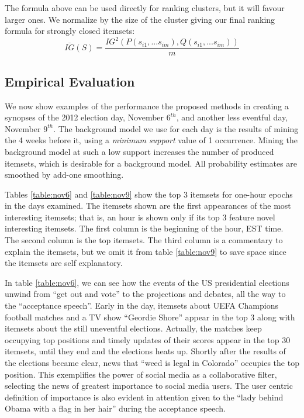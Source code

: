 \documentclass{sig-alternate}
\begin{document}
The formula above can be used directly for ranking clusters,
but it will favour larger ones.
We normalize by the size of the cluster giving our final ranking formula for
strongly closed itemsets:
\begin{equation}\label{eq:avgIG}\overline{IG}(S) = \frac{IG^2(P(s_{i1},...s_{im}),Q(s_{i1},...s_{im}))}{m}\end{equation}


\subsection{Empirical Evaluation}
\label{sec:empirical}
We now show examples of the performance the proposed methods in creating
a synopses of the 2012 election day, November $6^{th}$, and another less
eventful day, November $9^{th}$.
The background model we use for each day is the results of mining the 4 weeks
before it, using a \emph{minimum support} value of 1 occurrence.
Mining the background model at such a low support increases the number of
produced itemsets, which is desirable for a background model.
All probability estimates are smoothed by add-one smoothing. 

Tables \ref{table:nov6} and \ref{table:nov9}  show the top 3 itemsets for
one-hour epochs in the days examined.
The itemsets shown are the first appearances of the most interesting itemsets;
that is, an hour is shown only if its top 3 feature novel interesting itemsets. The first column is the beginning of the hour, EST time.
The second column is the top itemsets.
The third column is a commentary to explain the itemsets,
but we omit it from table \ref{table:nov9} to save space since the itemsets are self explanatory.

In table \ref{table:nov6}, we can see how the events of the US presidential
elections  unwind from ``get out and vote'' to the projections and debates,
all the way to the ``acceptance speech''.
Early in the day, itemsets about UEFA Champions football matches and a TV show
``Geordie Shore'' appear in the top 3 along with itemsets about the still
uneventful elections.
Actually, the matches keep occupying top positions and timely updates of their
scores appear in the top 30 itemsets, until they end and the elections
heats up.
Shortly after the results of the elections became clear, news that
``weed is legal in Colorado'' occupies the top position.
This exemplifies the power of social media as a collaborative filter,
selecting the news of greatest importance to social media users.
The user centric definition of importance is also evident in attention
given to the ``lady behind Obama  with a flag in her hair'' during the
acceptance speech. 
\end{document}
